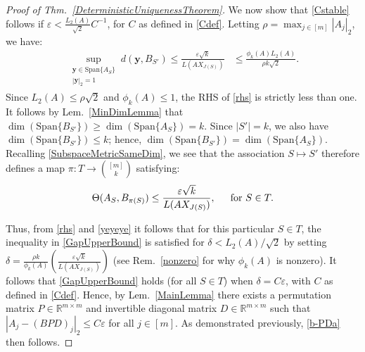 \documentclass[journal, twocolumn]{IEEEtran}
\begin{document}
\begin{proof}[Proof of Thm.~\ref{DeterministicUniquenessTheorem}]
We now show that \eqref{Cstable} follows if $\varepsilon < \frac{L_2(A)}{\sqrt{2}}C^{-1}$, for $C$ as defined in \eqref{Cdef}. Letting $\rho = \max_{j \in [m]} |A_j|_2$, we have:
\begin{align}\label{rhs}
\sup_{ \substack{ \mathbf{y} \in \text{Span}\{A_{S}\} \\ |\mathbf{y}|_2 = 1} } d(\mathbf{y}, B_{S'}) \leq \frac{\varepsilon\sqrt{k}}{L(AX_{J(S)})}
&\leq \frac{\phi_k(A) L_2(A)}{\rho k \sqrt{2}}.
\end{align}
Since $L_2(A) \leq \rho \sqrt{2}$ and $\phi_k(A) \leq 1$, the RHS of \eqref{rhs} is strictly less than one. It follows by Lem.~\ref{MinDimLemma} that $\dim(\text{Span}\{B_{S'}\}) \geq \dim(\text{Span}\{A_{S}\}) = k$. %
Since $|S'| = k$, we also have $\dim(\text{Span}\{B_{S'}\}) \leq k$; hence, $\dim(\text{Span}\{B_{S'}\}) = \dim(\text{Span}\{A_{S}\})$. Recalling \eqref{SubspaceMetricSameDim},  we see that the association $S \mapsto S'$ therefore defines a map $\pi: T \to {[m] \choose k}$ satisfying:
\begin{align}\label{yeyeye}
\Theta(A_{S}, B_{\pi(S)}) \leq \frac{\varepsilon\sqrt{k}}{ L(AX_{J(S)})}, \indent \text{for } S \in T.
\end{align}

Thus, from \eqref{rhs} and \eqref{yeyeye} it follows that for this particular $S \in T$, the inequality in \eqref{GapUpperBound} is satisfied for $\delta < L_2(A)/\sqrt{2}$ by setting $\delta = \frac{ \rho k}{ \phi_k(A) } \left(  \frac{\varepsilon \sqrt{k}}{L(AX_{J(S)})} \right)$ (see Rem.~\ref{nonzero} for why $\phi_k(A)$ is nonzero). It follows that \eqref{GapUpperBound} holds (for all $S \in T$) when $\delta = C\varepsilon$, with $C$ as defined in \eqref{Cdef}.
Hence, by Lem.~\ref{MainLemma} there exists a permutation matrix $P \in \mathbb{R}^{m \times m}$ and invertible diagonal matrix $D \in \mathbb{R}^{m \times m}$ such that $|A_j - (BPD)_j|_2 \leq C\varepsilon$ for all $j \in [m]$. As demonstrated previously, \eqref{b-PDa} then follows.
\end{proof}
\end{document}
